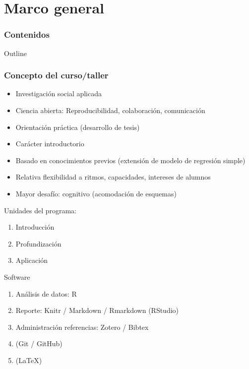 \documentclass[]{beamer} %
\begin{document}
\section{Marco general}

\begin{frame}%
	\frametitle{Contenidos}
	\begin{minipage}{\textwidth} %
	\end{minipage}
\end{frame}

\begin{frame}[allowframebreaks]{Outline} %
	\frametitle{Concepto del curso/taller}
  	\begin{itemize}%
  	\item Investigación social aplicada
		\item Ciencia abierta: Reproducibilidad, colaboración, comunicación
  	\item Orientación práctica (desarrollo de tesis)
  	\item Carácter introductorio
  	\item Basado en conocimientos previos (extensión de modelo de regresión simple)
  	\item Relativa flexibilidad a ritmos, capacidades, intereses de alumnos
  	\item Mayor desafío: cognitivo (acomodación de esquemas)
   	\end{itemize}

   \framebreak
   	 Unidades del programa:
   	 \begin{enumerate}
   	 	\item Introducción
   	 	\item Profundización
   	 	\item Aplicación
   	 \end{enumerate}

  \framebreak
  Software
  \begin{enumerate}
  	\item Análisis de datos: R
		\item Reporte: Knitr / Markdown / Rmarkdown (RStudio)
		\item Administración referencias: Zotero / Bibtex
		\item (Git / GitHub)
  	\item (\LaTeX)
  \end{enumerate}
\end{frame}
\end{document}
